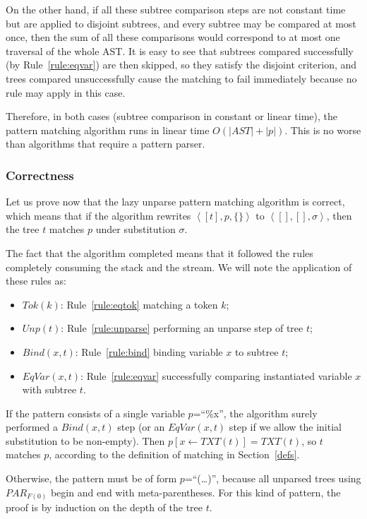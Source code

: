 \documentclass{sigplanconf}
\begin{document}
On the other hand, if all these subtree comparison steps are not
constant time but are applied to disjoint subtrees, and every subtree
may be compared at most once, then the sum of all these comparisons
would correspond to at most one traversal of the whole AST. It is easy
to see that subtrees compared successfully (by Rule~\ref{rule:eqvar})
are then skipped, so they satisfy the disjoint criterion, and trees
compared unsuccessfully cause the matching to fail immediately because
no rule may apply in this case.

Therefore, in both cases (subtree comparison in constant or linear
time), the pattern matching algorithm runs in linear time
$O(|AST|+|p|)$. This is no worse than algorithms that require a
pattern parser.

\subsubsection{Correctness}
Let us prove now that the lazy unparse pattern matching algorithm is
correct, which means that if the algorithm rewrites $\left<[t], p,
\{\}\right>$ to $\left<[], [], \sigma\right>$, then the tree $t$
matches $p$ under substitution $\sigma$.

The fact that the algorithm completed means that it followed the rules
completely consuming the stack and the stream. We will note the
application of these rules as:
\begin{itemize}
\item $Tok(k)$: Rule~\ref{rule:eqtok} matching a token $k$;
\item $Unp(t)$: Rule~\ref{rule:unparse} performing an unparse step of
tree $t$;
\item $Bind(x,t)$: Rule~\ref{rule:bind} binding variable $x$ to 
subtree $t$;
\item $EqVar(x,t)$: Rule~\ref{rule:eqvar} successfully comparing
instantiated variable $x$ with subtree $t$.
\end{itemize}

If the pattern consists of a single variable $p$=``\%x'', the
algorithm surely performed a $Bind(x,t)$ step (or an $EqVar(x,t)$ step
if we allow the initial substitution to be non-empty). Then $p[x\gets
TXT(t)]=TXT(t)$, so $t$ matches $p$, according to the definition of
matching in Section~\ref{defs}.

Otherwise, the pattern must be of form $p$=``(\dots)'', because all unparsed
trees using $PAR_{F(0)}$ begin and end with meta-parentheses.  For
this kind of pattern, the proof is by induction on the depth of the
tree $t$.
\end{document}
